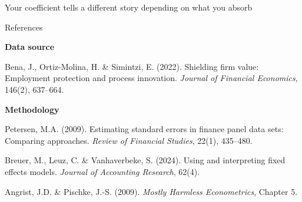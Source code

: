 \documentclass[aspectratio=169, 11pt]{beamer}
\begin{document}
\begin{frame}{Your coefficient tells a different story depending on what you absorb}

\vspace{1.2cm}

\begin{center}
\end{center}

\end{frame}


\begin{frame}{References}

\vspace{0.3cm}
\small

\textbf{Data source}

\vspace{0.15cm}

Bena, J., Ortiz-Molina, H. \& Simintzi, E. (2022). Shielding firm value:
Employment protection and process innovation. \textit{Journal of Financial
Economics}, 146(2), 637--664.

\vspace{0.5cm}

\textbf{Methodology}

\vspace{0.15cm}

Petersen, M.A. (2009). Estimating standard errors in finance panel data sets:
Comparing approaches. \textit{Review of Financial Studies}, 22(1), 435--480.

\vspace{0.15cm}

Breuer, M., Leuz, C. \& Vanhaverbeke, S. (2024). Using and interpreting
fixed effects models. \textit{Journal of Accounting Research}, 62(4).

\vspace{0.15cm}

Angrist, J.D. \& Pischke, J.-S. (2009). \textit{Mostly Harmless
Econometrics}, Chapter 5.

\end{frame}
\end{document}
